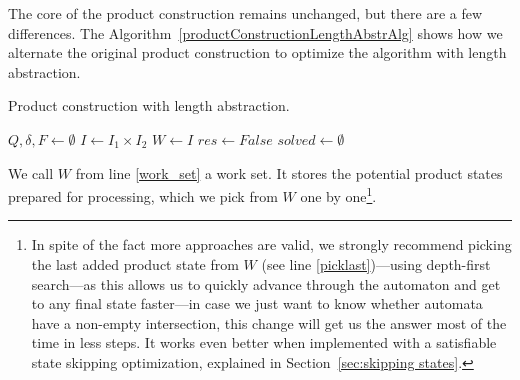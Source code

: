 The core of the product construction remains unchanged, but there are a few differences. The Algorithm~\ref{productConstructionLengthAbstrAlg} shows how we alternate the original product construction to optimize the algorithm with length abstraction.

\begin{algorithm}[ht]
\caption{Product construction with length abstraction.}\label{productConstructionLengthAbstrAlg}
\DontPrintSemicolon
{}
\BlankLine
$Q, \delta, F \gets \emptyset$ \;
$I \gets I_1 \times I_2$ \;
$W \gets I$ \;\label{work_set}
$res \gets False$ \;\label{sat}
$solved \gets \emptyset$ \;\label{solved}
\end{algorithm}

We call $W$ from line \ref{work_set} a work set. It stores the potential product states prepared for processing, which we pick from $W$ one by one\footnote{In spite of the fact more approaches are valid, we strongly recommend picking the last added product state from $W$ (see line \ref{picklast})---using depth-first search---as this allows us to quickly advance through the automaton and get to any final state faster---in case we just want to know whether automata have a non-empty intersection, this change will get us the answer most of the time in less steps. It works even better when implemented with a satisfiable state skipping optimization, explained in Section~\ref{sec:skipping states}.}.

